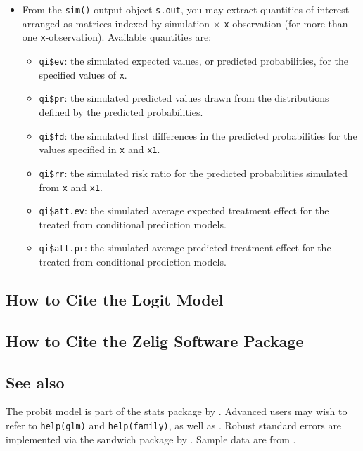 \documentclass{article}
\begin{document}
\begin{itemize}
\item From the {\tt sim()} output object {\tt s.out}, you may extract
  quantities of interest arranged as matrices indexed by simulation
  $\times$ {\tt x}-observation (for more than one {\tt x}-observation).
  Available quantities are:

   \begin{itemize}
   \item {\tt qi\$ev}: the simulated expected values, or predicted
     probabilities, for the specified values of {\tt x}.
   \item {\tt qi\$pr}: the simulated predicted values drawn from the
     distributions defined by the predicted probabilities.  
   \item {\tt qi\$fd}: the simulated first differences in the predicted
     probabilities for the values specified in {\tt x} and {\tt x1}.
   \item {\tt qi\$rr}: the simulated risk ratio for the predicted
     probabilities simulated from {\tt x} and {\tt x1}.
   \item {\tt qi\$att.ev}: the simulated average expected treatment
     effect for the treated from conditional prediction models.  
   \item {\tt qi\$att.pr}: the simulated average predicted treatment
     effect for the treated from conditional prediction models.  
   \end{itemize}
\end{itemize}

\subsection*{How to Cite the Logit Model}

\subsection*{How to Cite the Zelig Software Package}
\CiteZelig


\subsection* {See also}
The probit model is part of the stats package by \citet{VenRip02}.
Advanced users may wish to refer to \texttt{help(glm)} and
\texttt{help(family)}, as well as \cite{McCNel89}. Robust standard
errors are implemented via the sandwich package by \citet{Zeileis04}.
Sample data are from \cite{KinTomWit00}.



 
\end{document}
